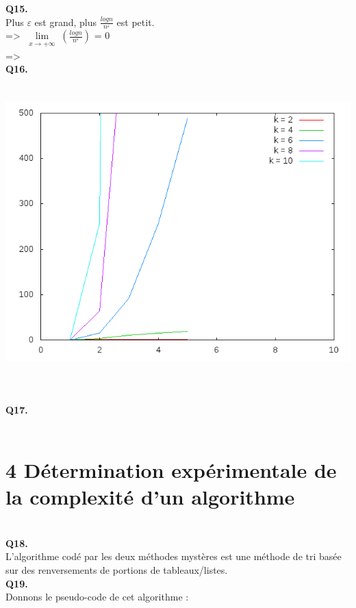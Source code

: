 \textbf{Q15.}
~\\
Plus $\varepsilon$ est grand, plus $\frac{log n}{n^\varepsilon}$ est petit.\\
=> $\lim\limits_{\substack{x \rightarrow +\infty}} (\frac{log n}{n^\varepsilon})$ = 0 \\
=> 
~\\

\textbf{Q16.}
~\\
\includegraphics[height=12cm, width=\textwidth]{../lin_npk2pn.png}
~\\

\textbf{Q17.}
~\\
~\\

\section*{4 Détermination expérimentale de la complexité d'un algorithme}
~\\

\textbf{Q18.}
~\\
L'algorithme codé par les deux méthodes mystères est une méthode de tri basée sur des renversements de portions de tableaux/listes.
~\\

\textbf{Q19.}
~\\
Donnons le pseudo-code de cet algorithme : \\

